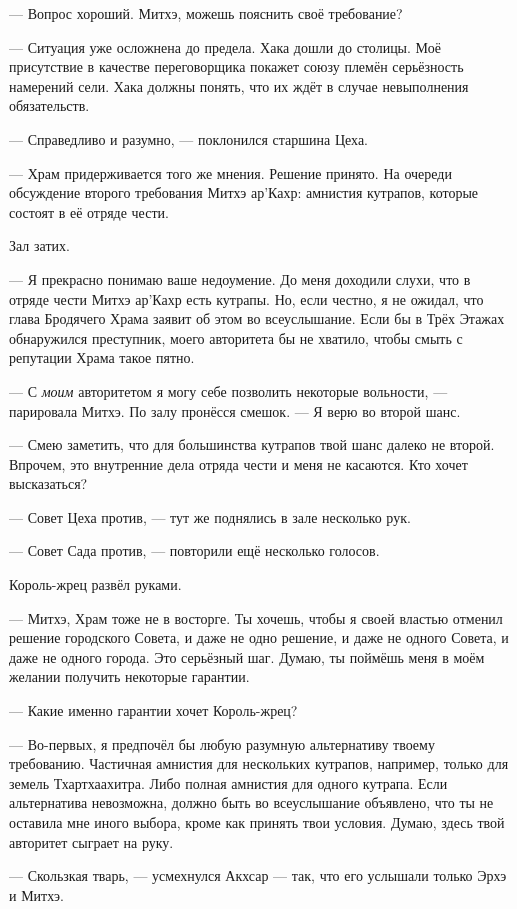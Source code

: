 --- Вопрос хороший.
Митхэ, можешь пояснить своё требование?

--- Ситуация уже осложнена до предела.
Хака дошли до столицы.
Моё присутствие в качестве переговорщика покажет союзу племён серьёзность намерений сели.
Хака должны понять, что их ждёт в случае невыполнения обязательств.

--- Справедливо и разумно, --- поклонился старшина Цеха.

--- Храм придерживается того же мнения.
Решение принято.
На очереди обсуждение второго требования Митхэ ар'Кахр: амнистия кутрапов, которые состоят в её отряде чести.

Зал затих.

--- Я прекрасно понимаю ваше недоумение.
До меня доходили слухи, что в отряде чести Митхэ ар'Кахр есть кутрапы.
Но, если честно, я не ожидал, что глава Бродячего Храма заявит об этом во всеуслышание.
Если бы в Трёх Этажах обнаружился преступник, моего авторитета бы не хватило, чтобы смыть с репутации Храма такое пятно.

--- С \emph{моим} авторитетом я могу себе позволить некоторые вольности, --- парировала Митхэ.
По залу пронёсся смешок.
--- Я верю во второй шанс.

--- Смею заметить, что для большинства кутрапов твой шанс далеко не второй.
Впрочем, это внутренние дела отряда чести и меня не касаются.
Кто хочет высказаться?

--- Совет Цеха против, --- тут же поднялись в зале несколько рук.

--- Совет Сада против, --- повторили ещё несколько голосов.

Король-жрец развёл руками.

--- Митхэ, Храм тоже не в восторге.
Ты хочешь, чтобы я своей властью отменил решение городского Совета, и даже не одно решение, и даже не одного Совета, и даже не одного города.
Это серьёзный шаг.
Думаю, ты поймёшь меня в моём желании получить некоторые гарантии.

--- Какие именно гарантии хочет Король-жрец?

--- Во-первых, я предпочёл бы любую разумную альтернативу твоему требованию.
Частичная амнистия для нескольких кутрапов, например, только для земель Тхартхаахитра.
Либо полная амнистия для одного кутрапа.
Если альтернатива невозможна, должно быть во всеуслышание объявлено, что ты не оставила мне иного выбора, кроме как принять твои условия.
Думаю, здесь твой авторитет сыграет на руку.

--- Скользкая тварь, --- усмехнулся Акхсар --- так, что его услышали только Эрхэ и Митхэ.

